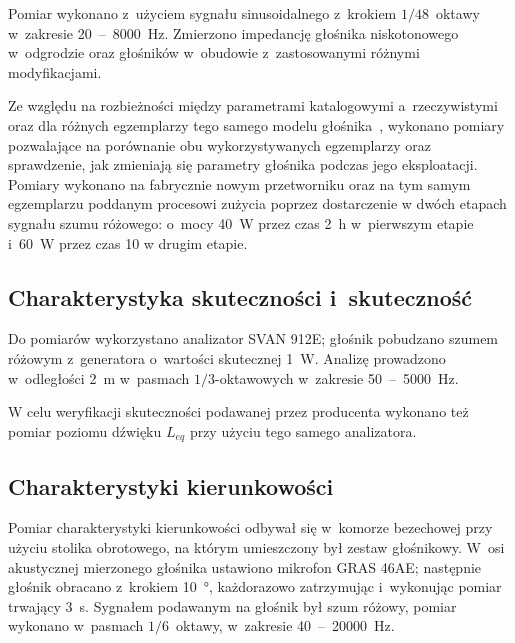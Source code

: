 \documentclass[12pt]{oska}
\newcommand{\range}[2]{\num{#1}~--~\num{#2}}
\begin{document}
	
	Pomiar wykonano z~użyciem sygnału sinusoidalnego z~krokiem $1/48$~oktawy w~zakresie \range{20}{8000}~\si{\hertz}. Zmierzono impedancję głośnika niskotonowego w~odgrodzie oraz głośników w~obudowie z~zastosowanymi różnymi modyfikacjami.
	
	Ze względu na rozbieżności między parametrami katalogowymi a~rzeczywistymi oraz dla różnych egzemplarzy tego samego modelu głośnika~\cite{aes_roznice}, wykonano pomiary pozwalające na porównanie obu wykorzystywanych egzemplarzy oraz sprawdzenie, jak zmieniają się parametry głośnika podczas jego eksploatacji. Pomiary wykonano na fabrycznie nowym przetworniku oraz na tym samym egzemplarzu poddanym procesowi zużycia poprzez dostarczenie w dwóch etapach sygnału szumu różowego: o~mocy \SI{40}{\watt} przez czas \SI{2}{\hour} w~pierwszym etapie i~\SI{60}{\watt} przez czas \SI{10}{\min} w drugim etapie.
	
	\subsection{Charakterystyka skuteczności i~skuteczność}
	
	Do pomiarów wykorzystano analizator SVAN 912E; głośnik pobudzano szumem różowym z~generatora o~wartości skutecznej \SI{1}{\watt}. Analizę prowadzono w~odległości \SI{2}{\metre} w~pasmach $1/3$-oktawowych w~zakresie \range{50}{5000}~\si{\hertz}.
	
	W celu weryfikacji skuteczności podawanej przez producenta wykonano też pomiar poziomu dźwięku $L_{eq}$ przy użyciu tego samego analizatora. 
	
	\subsection{Charakterystyki kierunkowości}
	
	
	Pomiar charakterystyki kierunkowości odbywał się w~komorze bezechowej przy użyciu stolika obrotowego, na którym umieszczony był zestaw głośnikowy. W~osi akustycznej mierzonego głośnika ustawiono mikrofon GRAS 46AE; następnie głośnik obracano z~krokiem \SI{10}{\degree}, każdorazowo zatrzymując i~wykonując pomiar trwający \SI{3}{\s}. Sygnałem podawanym na głośnik był szum różowy, pomiar wykonano w~pasmach $1/6$~oktawy, w~zakresie \range{40}{20000}~\si{\hertz}.
	
\end{document}
